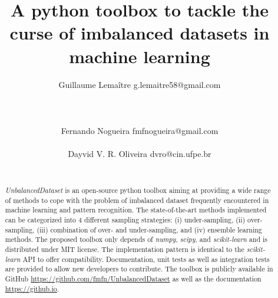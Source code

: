 \documentclass[twoside,11pt]{article}
\begin{document}
\title{A python toolbox to tackle the curse of imbalanced datasets in machine learning}
\author{Guillaume Lema\^itre \email g.lemaitre58@gmail.com \\ 
     \\ 
     \\ 
     \\ 
        \AND
        Fernando Nogueira \email fmfnogueira@gmail.com \\ 
         \\ 
        \AND
        Dayvid V. R. Oliveira \email dvro@cin.ufpe.br \\ 
         \\ 
        } 
\editor{-}

\maketitle

\begin{abstract}
\emph{UnbalancedDataset} is an open-source python toolbox aiming at providing a wide range of methods to cope with the problem of imbalanced dataset frequently encountered in machine learning and pattern recognition.
The state-of-the-art methods implemented can be categorized into 4 different sampling strategies: (i) under-sampling, (ii) over-sampling, (iii) combination of over- and under-sampling, and (iv) ensemble learning methods.
The proposed toolbox only depends of \emph{numpy}, \emph{scipy}, and \emph{scikit-learn} and is distributed under MIT license.
The implementation pattern is identical to the \emph{scikit-learn} API to offer compatibility.
Documentation, unit tests as well as integration tests are provided to allow new developers to contribute.
The toolbox is publicly available in GitHub \url{https://github.com/fmfn/UnbalancedDataset} as well as the documentation \url{https://github.io}.
\end{abstract}
\end{document}
